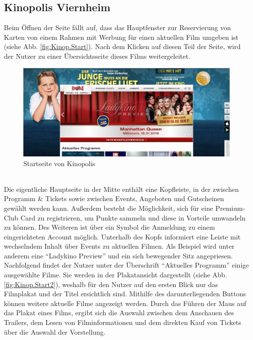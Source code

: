 	\subsection{Kinopolis Viernheim}
	Beim Öffnen der Seite fällt auf, dass das Hauptfenster zur Reservierung von Karten von einem Rahmen mit Werbung für einen aktuellen Film umgeben ist (siehe Abb. \vref{fig:Kinop.Start}). Nach dem Klicken auf diesen Teil der Seite, wird der Nutzer zu einer Übersichtsseite dieses Films weitergeleitet. 
	\begin{figure}
		\centering 
		\includegraphics[scale=0.38]{img/Kinopolis_MA_Startseite.png}
		\captionsetup{format=hang}
		\centering\caption[Startseite von Kinopolis Viernheim]{\label{fig:Kinop.Start}Startseite von Kinopolis\footnotemark}
	\end{figure} 
	\\Die eigentliche Hauptseite in der Mitte enthält eine Kopfleiste, in der zwischen Programm \& Tickets sowie zwischen Events, Angeboten und Gutscheinen gewählt werden kann. Außerdem besteht die Möglichkeit, sich für eine Premium-Club Card zu registrieren, um Punkte sammeln und diese in Vorteile umwandeln zu können. Des Weiteren ist über ein Symbol die Anmeldung zu einem eingerichteten Account möglich. Unterhalb des Kopfs informiert eine Leiste mit wechselndem Inhalt über Events zu aktuellen Filmen. Als Beispiel wird unter anderem eine \enquote{Ladykino Preview} und ein sich bewegender Sitz angepriesen. 
	\\Nachfolgend findet der Nutzer unter der Überschrift \enquote{Aktuelles Programm} einige ausgewählte Filme. Sie werden in der Plakatansicht dargestellt (siehe Abb. \vref{fig:Kinop.Start2}), weshalb für den Nutzer auf den ersten Blick nur das Filmplakat und der Titel ersichtlich sind. Mithilfe des darunterliegenden Buttons können weitere aktuelle Filme angezeigt werden. Durch das Führen der Maus auf das Plakat eines Films, ergibt sich die Auswahl zwischen dem Anschauen des Trailers, dem Lesen von Filminformationen und dem direkten Kauf von Tickets über die Auswahl der Vorstellung.
